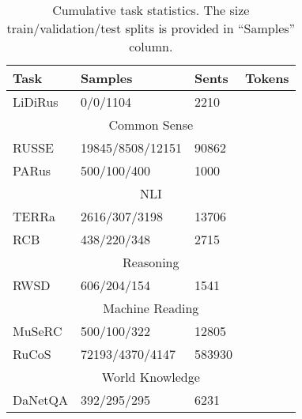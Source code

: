 \documentclass[11pt,a4paper]{article}
\begin{document}
\begin{table}[tbh!]
\centering
\small
\begin{tabular}{|l|l|l|l|}
\hline
Task                                & Samples & Sents & Tokens  \\ \hline
LiDiRus                                                   & 0/0/1104                     & 2210                       &              \\ \hline
\multicolumn{4}{|c|}{Common Sense}    \\\hline
RUSSE                                                     & 19845/8508/12151             & 90862                      &                   \\
PARus                                                     & 500/100/400                  & 1000                       &                 \\ \hline
\multicolumn{4}{|c|}{NLI}                            \\\hline
TERRa                                                     & 2616/307/3198                & 13706                      &                \\
RCB                                                       & 438/220/348                  & 2715                       &                 \\ \hline
\multicolumn{4}{|c|}{Reasoning}                       \\\hline
RWSD                                                      & 606/204/154                  & 1541                       &                  \\ \hline
\multicolumn{4}{|c|}{Machine Reading}  \\\hline
MuSeRC                                                    & 500/100/322                  & 12805                      &                   \\
RuCoS                                                     & 72193/4370/4147              & 583930                     &              \\ \hline
\multicolumn{4}{|c|}{World Knowledge}                     \\\hline
DaNetQA                                                   & 392/295/295                  & 6231                       &                    \\ \hline
\end{tabular}
\caption{Cumulative task statistics. The size train/validation/test splits is  provided in ``Samples'' column.}
\label{table:stats}
\end{table}
\end{document}
